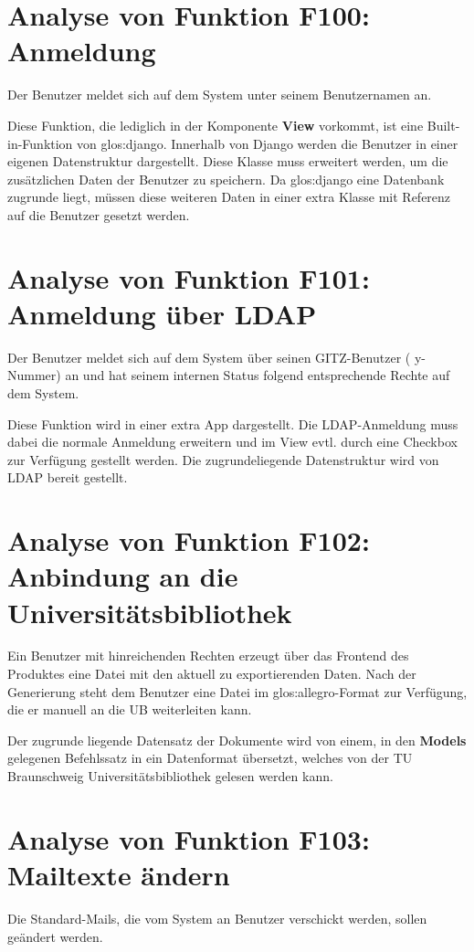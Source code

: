 \section{Analyse von Funktion F100: Anmeldung}
Der Benutzer meldet sich auf dem System unter seinem Benutzernamen an.

Diese Funktion, die lediglich in der Komponente \textbf{View} vorkommt, ist
eine Built-in-Funktion von \gls{glos:django}. Innerhalb von Django werden die Benutzer
in einer eigenen Datenstruktur  dargestellt. Diese Klasse muss erweitert werden,
um die zusätzlichen Daten der Benutzer zu speichern. Da \gls{glos:django} eine Datenbank
zugrunde liegt, müssen diese weiteren Daten in einer extra Klasse mit Referenz
auf die Benutzer gesetzt werden.

\section{Analyse von Funktion F101: Anmeldung über LDAP}
Der Benutzer meldet sich auf dem System über seinen \Gls{GITZ}-Benutzer (\zB
y-Nummer) an und hat seinem internen Status folgend entsprechende Rechte auf dem
System.

Diese Funktion wird in einer extra App dargestellt. Die \gls{LDAP}-Anmeldung muss
dabei die normale Anmeldung erweitern und im View evtl. durch eine Checkbox zur
Verfügung gestellt werden. Die zugrundeliegende Datenstruktur wird von \gls{LDAP}
bereit gestellt.

\section{Analyse von Funktion F102: Anbindung an die Universitätsbibliothek}
Ein Benutzer mit hinreichenden Rechten erzeugt über das Frontend des Produktes
eine Datei mit den aktuell zu exportierenden Daten. Nach der Generierung steht
dem Benutzer eine Datei im \gls{glos:allegro}-Format zur Verfügung, die er
manuell an die \gls{UB} weiterleiten kann.

Der zugrunde liegende Datensatz der Dokumente wird von einem, in den
\textbf{Models} gelegenen Befehlssatz in ein Datenformat übersetzt, welches von
der TU Braunschweig Universitätsbibliothek gelesen werden kann. 

\section{Analyse von Funktion F103: Mailtexte ändern}
Die Standard-Mails, die vom System an Benutzer verschickt werden, sollen geändert
werden.

